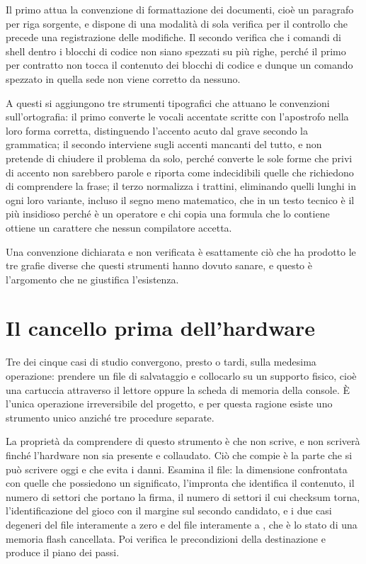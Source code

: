 Il primo attua la convenzione di formattazione dei documenti, cioè un paragrafo per riga sorgente, e dispone di una modalità di sola verifica per il controllo che precede una registrazione delle modifiche. Il secondo verifica che i comandi di shell dentro i blocchi di codice non siano spezzati su più righe, perché il primo per contratto non tocca il contenuto dei blocchi di codice e dunque un comando spezzato in quella sede non viene corretto da nessuno.

A questi si aggiungono tre strumenti tipografici che attuano le convenzioni sull'ortografia: il primo converte le vocali accentate scritte con l'apostrofo nella loro forma corretta, distinguendo l'accento acuto dal grave secondo la grammatica; il secondo interviene sugli accenti mancanti del tutto, e non pretende di chiudere il problema da solo, perché converte le sole forme che privi di accento non sarebbero parole e riporta come indecidibili quelle che richiedono di comprendere la frase; il terzo normalizza i trattini, eliminando quelli lunghi in ogni loro variante, incluso il segno meno matematico, che in un testo tecnico è il più insidioso perché è un operatore e chi copia una formula che lo contiene ottiene un carattere che nessun compilatore accetta.

Una convenzione dichiarata e non verificata è esattamente ciò che ha prodotto le tre grafie diverse che questi strumenti hanno dovuto sanare, e questo è l'argomento che ne giustifica l'esistenza.

\section{Il cancello prima dell'hardware}

Tre dei cinque casi di studio convergono, presto o tardi, sulla medesima operazione: prendere un file di salvataggio e collocarlo su un supporto fisico, cioè una cartuccia attraverso il lettore oppure la scheda di memoria della console. È l'unica operazione irreversibile del progetto, e per questa ragione esiste uno strumento unico anziché tre procedure separate.

La proprietà da comprendere di questo strumento è che non scrive, e non scriverà finché l'hardware non sia presente e collaudato. Ciò che compie è la parte che si può scrivere oggi e che evita i danni. Esamina il file: la dimensione confrontata con quelle che possiedono un significato, l'impronta che identifica il contenuto, il numero di settori che portano la firma, il numero di settori il cui checksum torna, l'identificazione del gioco con il margine sul secondo candidato, e i due casi degeneri del file interamente a zero e del file interamente a , che è lo stato di una memoria flash cancellata. Poi verifica le precondizioni della destinazione e produce il piano dei passi.

